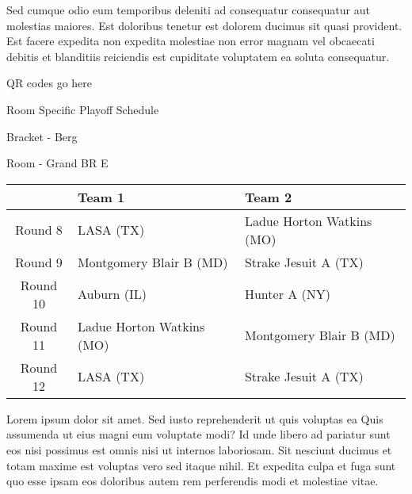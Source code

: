 \documentclass{article}%
\begin{document}
\newline%
Sed cumque odio eum temporibus deleniti ad consequatur consequatur aut molestias maiores. Est doloribus tenetur est dolorem ducimus sit quasi provident. Est facere expedita non expedita molestiae non error magnam vel obcaecati debitis et blanditiis reiciendis est cupiditate voluptatem ea soluta consequatur.%
\vspace*{140pt}%
\begin{center}%
\begin{Huge}%
QR codes go here%
\end{Huge}%
\end{center}%
\newpage%
\begin{center}%
\begin{Huge}%
Room Specific Playoff Schedule%
\end{Huge}%
\vspace*{8pt}%
\linebreak%
\begin{Large}%
Bracket {-} Berg%
\end{Large}%
\vspace*{8pt}%
\linebreak%
\vspace*{8pt}%
\begin{Large}%
Room {-} Grand BR E%
\end{Large}%
\end{center}%
%
\begin{tabularx}{\textwidth}{|c|Y|Y|}%
\hline%
&Team 1&Team 2\\%
\hline%
Round 8&LASA (TX)&Ladue Horton Watkins (MO)\\%
Round 9&Montgomery Blair B (MD)&Strake Jesuit A (TX)\\%
Round 10&Auburn (IL)&Hunter A (NY)\\%
Round 11&Ladue Horton Watkins (MO)&Montgomery Blair B (MD)\\%
Round 12&LASA (TX)&Strake Jesuit A (TX)\\%
\hline%
\end{tabularx}%
\vspace*{8pt}%
\newline%
Lorem ipsum dolor sit amet. Sed iusto reprehenderit ut quis voluptas ea Quis assumenda ut eius magni eum voluptate modi? Id unde libero ad pariatur sunt eos nisi possimus est omnis nisi ut internos laboriosam. Sit nesciunt ducimus et totam maxime est voluptas vero sed itaque nihil. Et expedita culpa et fuga sunt quo esse ipsam eos doloribus autem rem perferendis modi et molestiae vitae.\newline%
\end{document}
